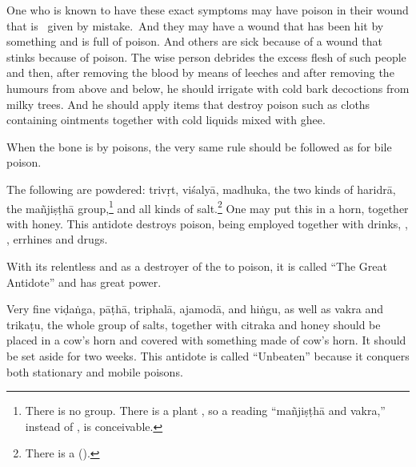 \begin{translation}
\item[58.1--60]

\begin{sloka}
    
    One who is known to have these exact symptoms may have poison
    in their wound  that is \dag\ given by mistake.\dag\ And they may have 
    a wound that  has been hit by something
     and is full of poison. And others
    are sick because of a wound that stinks because of poison.  
    The wise person debrides the excess flesh of such people and then, after
    removing the blood by means of leeches and after removing the
    humours from above and below, he should irrigate with cold bark
    decoctions from milky trees.   And he should apply items that destroy poison 
    such as cloths containing 
    ointments together with cold liquids mixed with ghee.
        
\end{sloka}
    
\item[61ab]    

\begin{sloka}
    When the bone is  by poisons, the very same rule should be 
    followed as for bile poison.

\item[61cd--63ab] The following are powdered: %
\gls{trivṛt}, \gls{viśalyā}, \gls{madhuka}, the two kinds of \gls{haridrā}, the
\gls{mañjiṣṭhā} group,\footnote{There is no  group. There is a
    plant , so a reading  “\gls{mañjiṣṭhā} and
    \gls{vakra},” instead of , is conceivable.} and all 
    kinds of salt.\footnote{There is a
         ().} One may put this 
        in 
        a horn,
        together with honey.   This antidote destroys poison, being employed 
        together
        with drinks, , , errhines 
        and
        drugs.

With its relentless  and as a destroyer of the
 to poison, it is called “The Great Antidote” and has
great power.
\end{sloka} 




\item[63cd--65ab]

Very fine \gls{viḍaṅga}, \gls{pāṭhā}, \gls{triphalā}, \gls{ajamodā}, and
\gls{hiṅgu}, as well as \gls{vakra} and \gls{trikaṭu}, the whole group of salts,
together with \gls{citraka} and honey should be placed in a cow's horn and 
covered with something made of cow's horn.  It should be set aside for two 
weeks.
%
This antidote is called “Unbeaten” because it conquers  both stationary and 
mobile poisons. 


\end{translation}
